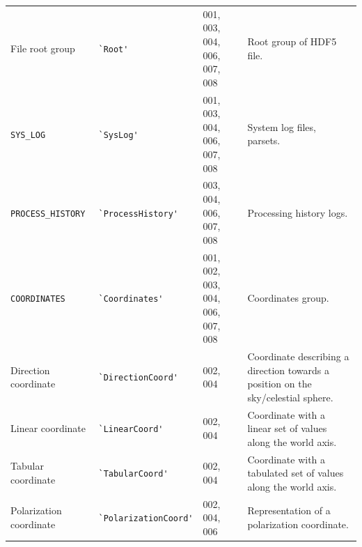 \documentclass[a4paper,10pt,bibtotoc]{scrartcl}
\begin{document}
\begin{center}
  \tablelasttail{\hline}
  \begin{supertabular}{llp{3cm}p{5.5cm}}
    \shrinkheight{-3em}
    File root group         & \verb|`Root'|
                            & \small 001, 003, 004, 006, 007, 008
                            & Root group of HDF5 file. \\
    \verb|SYS_LOG|          & \verb|`SysLog'|
                            & \small 001, 003, 004, 006, 007, 008
                            & System log files, parsets. \\
    \verb|PROCESS_HISTORY|  & \verb|`ProcessHistory'|
                            & \small 003, 004, 006, 007, 008
                            & Processing history logs. \\
    \verb|COORDINATES|      & \verb|`Coordinates'|
                            & \small 001, 002, 003, 004, 006, 007, 008
                            & Coordinates group. \\
    Direction coordinate    & \verb|`DirectionCoord'|
                            & \small 002, 004
                            & Coordinate describing a direction towards
                            a position on the sky/celestial sphere. \\
    Linear coordinate       & \verb|`LinearCoord'|
                            & \small 002, 004
                            & Coordinate with a linear set of values
                            along the world axis. \\
    Tabular coordinate      & \verb|`TabularCoord'|
                            & \small 002, 004
                            & Coordinate with a tabulated set of values
                            along the world axis. \\
    Polarization coordinate & \verb|`PolarizationCoord'|
                            & \small 002, 004, 006
                            & Representation of a polarization coordinate. \\

\end{supertabular}
\end{center}
\end{document}
